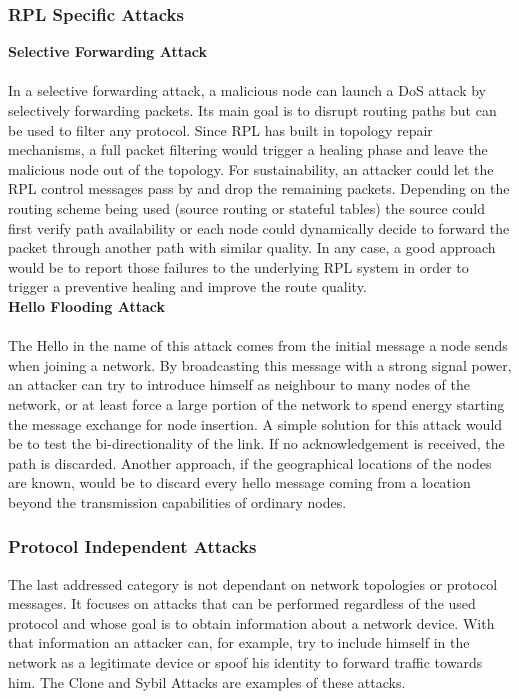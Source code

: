 \documentclass{sig-alternate-05-2015}
\begin{document}
\subsubsection{RPL Specific Attacks}
\medskip
\textbf{Selective Forwarding Attack}\\\\
In a selective forwarding attack, a malicious node can launch a \gls{DoS} attack by selectively forwarding packets. Its main goal is to disrupt routing paths but can be used to filter any protocol. Since \gls{RPL} has built in topology repair mechanisms, a full packet filtering would trigger a healing phase and leave the malicious node out of the topology. For sustainability, an attacker could let the RPL control messages pass by and drop the remaining packets. Depending on the routing scheme being used (source routing or stateful tables) the source could first verify path availability or each node could dynamically decide to forward the packet through another path with similar quality. In any case, a good approach would be to report those failures to the underlying RPL system in order to trigger a preventive healing and improve the route quality.\\

\textbf{Hello Flooding Attack}\\\\
The Hello in the name of this attack comes from the initial message a node sends when joining a network. By broadcasting this message with a strong signal power, an attacker can try to introduce himself as neighbour to many nodes of the network, or at least force a large portion of the network to spend energy starting the message exchange for node insertion. A simple solution for this attack would be to test the bi-directionality of the link. If no acknowledgement is received, the path is discarded. Another approach, if the geographical locations of the nodes are known, would be to discard every hello message coming from a location beyond the transmission capabilities of ordinary nodes.

\subsubsection{Protocol Independent Attacks}
The last addressed category is not dependant on network topologies or protocol messages. It focuses on attacks that can be performed regardless of the used protocol and whose goal is to obtain information about a network device. With that information an attacker can, for example, try to include himself in the network as a legitimate device or spoof his identity to forward traffic towards him. The Clone and Sybil Attacks are examples of these attacks.\\
\end{document}
